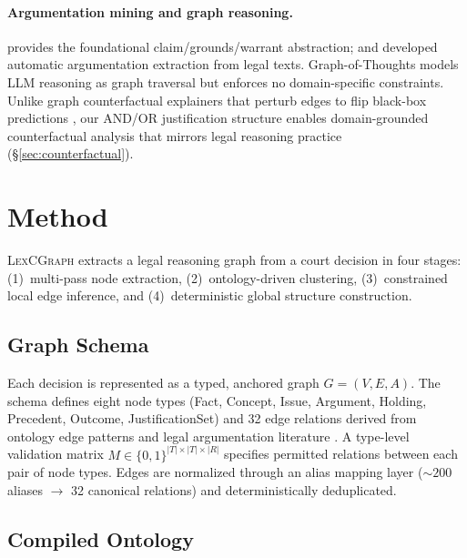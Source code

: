 \documentclass[11pt]{article}
\begin{document}
\paragraph{Argumentation mining and graph reasoning.}
\citet{toulmin1958uses} provides the foundational claim/grounds/warrant abstraction; \citet{mochales2011argumentation} and \citet{wyner2010approaches} developed automatic argumentation extraction from legal texts. Graph-of-Thoughts \cite{besta2024got} models LLM reasoning as graph traversal but enforces no domain-specific constraints. Unlike graph counterfactual explainers that perturb edges to flip black-box predictions \cite{tan2022counterfactual}, our AND/OR justification structure enables domain-grounded counterfactual analysis that mirrors legal reasoning practice (\S\ref{sec:counterfactual}).

\section{Method}
\label{sec:method}

\textsc{LexCGraph} extracts a legal reasoning graph from a court decision in four stages: (1)~multi-pass node extraction, (2)~ontology-driven clustering, (3)~constrained local edge inference, and (4)~deterministic global structure construction.

\subsection{Graph Schema}
\label{sec:schema}

Each decision is represented as a typed, anchored graph $G = (V, E, A)$. The schema defines eight node types (Fact, Concept, Issue, Argument, Holding, Precedent, Outcome, JustificationSet) and 32 edge relations derived from ontology edge patterns and legal argumentation literature \cite{toulmin1958uses,mochales2011argumentation}. A type-level validation matrix $M \in \{0,1\}^{|T| \times |T| \times |R|}$ specifies permitted relations between each pair of node types. Edges are normalized through an alias mapping layer (${\sim}200$ aliases $\rightarrow$ 32 canonical relations) and deterministically deduplicated.

\subsection{Compiled Ontology}
\label{sec:ontology}
\end{document}

